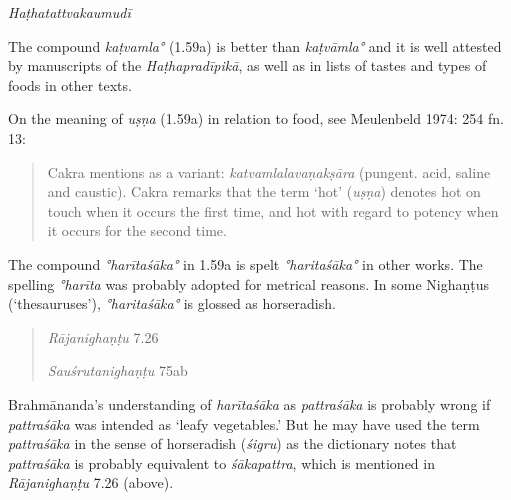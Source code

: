 \begin{ekdosis}
\begin{testimonia}[hp01_059]
\emph{Haṭhatattvakaumudī}

\begin{versinnote}
\end{versinnote}

\end{testimonia}

\begin{philcomm}[hp01_059]
The compound \emph{kaṭvamla°} (1.59a) is better than \emph{kaṭvāmla°} and it is well attested by manuscripts of the \emph{Haṭhapradīpikā}, as well as in lists of tastes and types of foods in other texts.

On the meaning of \emph{uṣṇa} (1.59a) in relation to food, see Meulenbeld 1974: 254 fn. 13:
\begin{quote}
Cakra mentions as a variant: \emph{katvamlalavaṇakṣāra} (pungent. acid, saline and caustic). Cakra remarks that the term `hot' (\emph{uṣṇa}) denotes hot on touch when it occurs the first time, and hot with regard to potency when it occurs for the second time.
\end{quote}

The compound \emph{°harītaśāka°} in 1.59a is spelt \emph{°haritaśāka°} in other works. The spelling \emph{°harīta} was probably adopted for metrical reasons. In some Nighaṇṭus (`thesauruses'), \emph{°haritaśāka°} is glossed as horseradish.
\begin{quote}
\emph{Rājanighaṇṭu} 7.26

\begin{versinnote}
\end{versinnote}
\emph{Sauśrutanighaṇṭu} 75ab
\begin{versinnote}
\end{versinnote}
\end{quote}

Brahmānanda’s understanding of \emph{harītaśāka} as \emph{pattraśāka} is probably wrong if \emph{pattraśāka} was intended as ‘leafy vegetables.’ But he may have used the term \emph{pattraśāka} in the sense of horseradish (\emph{śigru}) as the dictionary notes that \emph{pattraśāka} is probably equivalent to \emph{śākapattra}, which is mentioned in \emph{Rājanighaṇṭu} 7.26 (above).


\end{philcomm}
\end{ekdosis}
